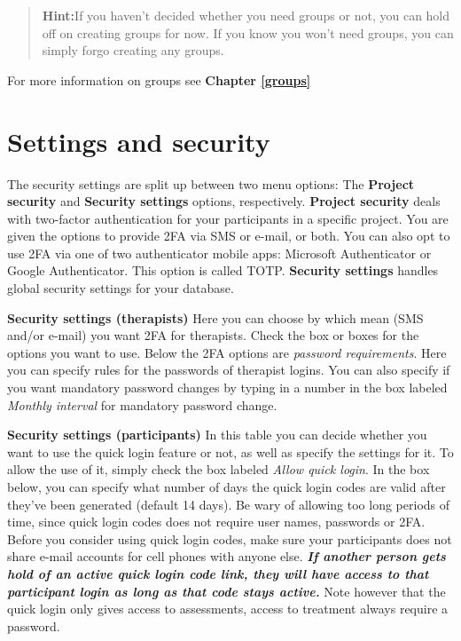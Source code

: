 \documentclass[
]{book}
\begin{document}
\begin{quote}
\textbf{Hint:}If you haven't decided whether you need groups or not, you can hold off on creating groups for now. If you know you won't need groups, you can simply forgo creating any groups.
\end{quote}

For more information on groups see \textbf{Chapter \ref{groups}}

\chapter{Settings and security}\label{settings-and-security}

The security settings are split up between two menu options: The \textbf{Project security} and \textbf{Security settings} options, respectively. \textbf{Project security} deals with two-factor authentication for your participants in a specific project. You are given the options to provide 2FA via SMS or e-mail, or both. You can also opt to use 2FA via one of two authenticator mobile apps: Microsoft Authenticator or Google Authenticator. This option is called TOTP.
\textbf{Security settings} handles global security settings for your database.

\textbf{Security settings (therapists)}
Here you can choose by which mean (SMS and/or e-mail) you want 2FA for therapists. Check the box or boxes for the options you want to use.
Below the 2FA options are \emph{password requirements}. Here you can specify rules for the passwords of therapist logins. You can also specify if you want mandatory password changes by typing in a number in the box labeled \emph{Monthly interval} for mandatory password change.

\textbf{Security settings (participants)}
In this table you can decide whether you want to use the quick login feature or not, as well as specify the settings for it. To allow the use of it, simply check the box labeled \emph{Allow quick login}.
In the box below, you can specify what number of days the quick login codes are valid after they've been generated (default 14 days). Be wary of allowing too long periods of time, since quick login codes does not require user names, passwords or 2FA. Before you consider using quick login codes, make sure your participants does not share e-mail accounts for cell phones with anyone else. \textbf{\emph{If another person gets hold of an active quick login code link, they will have access to that participant login as long as that code stays active.}} Note however that the quick login only gives access to assessments, access to treatment always require a password.
\end{document}
